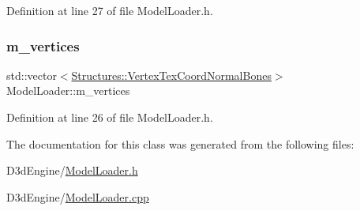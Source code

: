 Definition at line 27 of file Model\+Loader.\+h.

\mbox{\label{class_model_loader_ac87b9662dae9c00b140bc90c30c088ee}} 
\subsubsection{\texorpdfstring{m\+\_\+vertices}{m\_vertices}}
{\footnotesize\ttfamily std\+::vector$<$\mbox{\hyperlink{struct_structures_1_1_vertex_tex_coord_normal_bones}{Structures\+::\+Vertex\+Tex\+Coord\+Normal\+Bones}}$>$ Model\+Loader\+::m\+\_\+vertices\hspace{0.3cm}{\ttfamily [private]}}



Definition at line 26 of file Model\+Loader.\+h.



The documentation for this class was generated from the following files\+:\begin{DoxyCompactItemize}
\item 
D3d\+Engine/\mbox{\hyperlink{_model_loader_8h}{Model\+Loader.\+h}}\item 
D3d\+Engine/\mbox{\hyperlink{_model_loader_8cpp}{Model\+Loader.\+cpp}}\end{DoxyCompactItemize}
